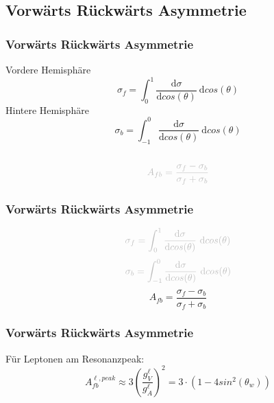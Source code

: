 \subsection{Vorwärts Rückwärts Asymmetrie}
\begin{frame}
	\frametitle{Vorwärts Rückwärts Asymmetrie}
	\begin{center}
		Vordere Hemisphäre
		\begin{equation*}
		\sigma_f=\int_{0}^{1}\frac{\text{d}\sigma}{\text{d}cos(\theta)}~\text{d}cos(\theta)
		\end{equation*}
		Hintere Hemisphäre
		\begin{equation*}
		\sigma_b=\int_{-1}^{0}\frac{\text{d}\sigma}{\text{d}cos(\theta)}~\text{d}cos(\theta)
		\end{equation*}
		\\
		\begin{equation*}
		\textcolor{lightgray}{A_{fb}=\frac{\sigma_f-\sigma_b}{\sigma_f+\sigma_b}}
		\end{equation*}
	\end{center}
\end{frame}
\begin{frame}
	\frametitle{Vorwärts Rückwärts Asymmetrie}
	\begin{center}
		\begin{equation*}
		\textcolor{lightgray}{\sigma_f=\int_{0}^{1}\frac{\text{d}\sigma}{\text{d}cos(\theta)}~\text{d}cos(\theta)}
		\end{equation*}
		\begin{equation*}
		\textcolor{lightgray}{\sigma_b=\int_{-1}^{0}\frac{\text{d}\sigma}{\text{d}cos(\theta)}~\text{d}cos(\theta)}
		\end{equation*}
		\begin{equation*}
		A_{fb}=\frac{\sigma_f-\sigma_b}{\sigma_f+\sigma_b}
		\end{equation*}
	\end{center}
\end{frame}
\begin{frame}
	\frametitle{Vorwärts Rückwärts Asymmetrie}
	\begin{center}
		Für Leptonen am Resonanzpeak:
		\begin{equation*}
		A_{fb}^{\ell,peak}\approx 3 \left ( \frac{g^{\ell}_V}{g^{\ell}_A} \right )^2=3\cdot (1-4 sin^2(\theta_w))
		\end{equation*}
	\end{center}
\end{frame}